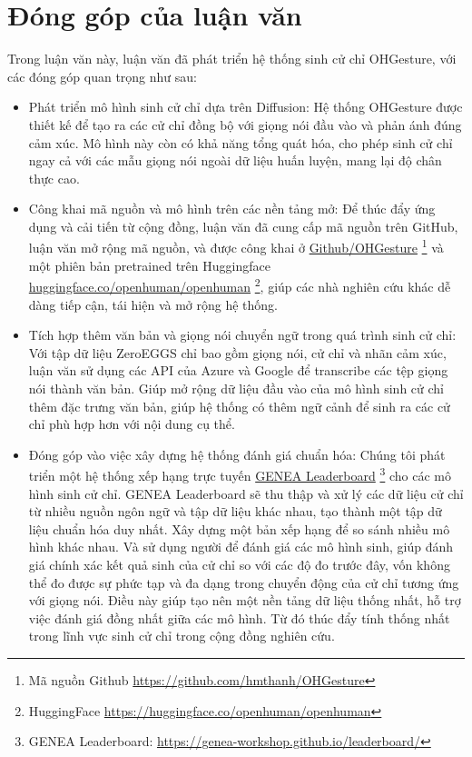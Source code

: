 


\section{Đóng góp của luận văn}
\label{sec:contribution}

Trong luận văn này, luận văn đã phát triển hệ thống sinh cử chỉ OHGesture, với các đóng góp quan trọng như sau:

\begin{itemize}
	\item Phát triển mô hình sinh cử chỉ dựa trên Diffusion: Hệ thống OHGesture được thiết kế để tạo ra các cử chỉ đồng bộ với giọng nói đầu vào và phản ánh đúng cảm xúc. Mô hình này còn có khả năng tổng quát hóa, cho phép sinh cử chỉ ngay cả với các mẫu giọng nói ngoài dữ liệu huấn luyện, mang lại độ chân thực cao.
	
	\item Công khai mã nguồn và mô hình trên các nền tảng mở: Để thúc đẩy ứng dụng và cải tiến từ cộng đồng, luận văn đã cung cấp mã nguồn trên GitHub, luận văn mở rộng mã nguồn, và được công khai ở \hyperlink{https://github.com/hmthanh/OHGesture}{Github/OHGesture} \footnote{Mã nguồn Github \url{https://github.com/hmthanh/OHGesture}} và một phiên bản pretrained trên Huggingface \hyperlink{https://huggingface.co/openhuman/openhuman}{huggingface.co/openhuman/openhuman} \footnote{HuggingFace \url{https://huggingface.co/openhuman/openhuman}}, giúp các nhà nghiên cứu khác dễ dàng tiếp cận, tái hiện và mở rộng hệ thống.
	
	\item Tích hợp thêm văn bản và giọng nói chuyển ngữ trong quá trình sinh cử chỉ: Với tập dữ liệu ZeroEGGS chỉ bao gồm giọng nói, cử chỉ và nhãn cảm xúc, luận văn sử dụng các API của Azure và Google để transcribe các tệp giọng nói thành văn bản. Giúp mở rộng dữ liệu đầu vào của mô hình sinh cử chỉ thêm đặc trưng văn bản, giúp hệ thống có thêm ngữ cảnh để sinh ra các cử chỉ phù hợp hơn với nội dung cụ thể.
	
	\item Đóng góp vào việc xây dựng hệ thống đánh giá chuẩn hóa: Chúng tôi phát triển một hệ thống xếp hạng trực tuyến \hyperlink{https://genea-workshop.github.io/leaderboard/}{GENEA Leaderboard} \footnote{GENEA Leaderboard: \url{https://genea-workshop.github.io/leaderboard/}} \cite{nagy2024towards} cho các mô hình sinh cử chỉ. GENEA Leaderboard sẽ thu thập và xử lý các dữ liệu cử chỉ từ nhiều nguồn ngôn ngữ và tập dữ liệu khác nhau, tạo thành một tập dữ liệu chuẩn hóa duy nhất. Xây dựng một bản xếp hạng để so sánh nhiều mô hình khác nhau. Và sử dụng người để đánh giá các mô hình sinh, giúp đánh giá chính xác kết quả sinh của cử chỉ so với các độ đo trước đây, vốn không thể đo được sự phức tạp và đa dạng trong chuyển động của cử chỉ tương ứng với giọng nói. Điều này giúp tạo nên một nền tảng dữ liệu thống nhất, hỗ trợ việc đánh giá đồng nhất giữa các mô hình. Từ đó thúc đẩy tính thống nhất trong lĩnh vực sinh cử chỉ trong cộng đồng nghiên cứu.
	

\end{itemize}
